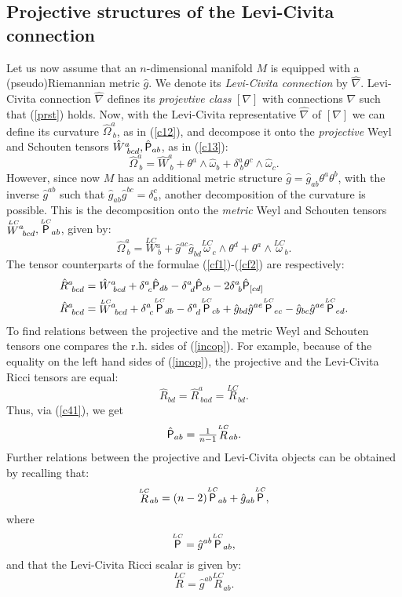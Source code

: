 \documentclass[letterpaper]{amsart}
\theoremstyle{definition}
\theoremstyle{remark}
\newcommand{\be}{\begin{equation}}
\newcommand{\ee}{\end{equation}}
\newcommand{\weyl}{{\stackrel{\scriptscriptstyle{LC}}{W}}\phantom{}}
\newcommand{\schou}{{\stackrel{\scriptscriptstyle{LC}}{\Rho}}}
\newcommand{\rlc}{{\stackrel{\scriptscriptstyle{LC}}{R}}}
\newcommand{\oms}{{\stackrel{\scriptscriptstyle{LC}}{\omega}}}
\newcommand{\dz}{\wedge}
\newcommand{\Rho}{{\mbox{\sf P}}}
\begin{document}
\subsection{Projective structures of the Levi-Civita connection}\label{sec22}
Let us now assume that an $n$-dimensional manifold $M$ is equipped
with a (pseudo)\-Riemannian metric $\hat{g}$. We denote its 
\emph{Levi-Civita connection} by $\hat{\nabla}$. Levi-Civita
connection $\hat{\nabla}$ 
defines its \emph{projevtive class} $[\nabla]$ 
with connections $\nabla$ such that (\ref{prst}) holds. Now, with the
Levi-Civita representative $\hat{\nabla}$ of $[\nabla]$ we can define
its curvature $\hat{\Omega}^a_{~b}$, as in (\ref{c12}), and decompose
it onto the \emph{projective} Weyl and Schouten tensors
$\hat{W}^a_{~bcd},\hat{\Rho}_{ab}$, as in
(\ref{c13}):
\be
\hat{\Omega}^a_{~b}=\hat{W}^a_{~b}+\theta^a\dz\hat{\omega}_b+\delta^a_{~b}\theta^c\dz\hat{\omega}_c.\label{cf1}\ee
However, since now $M$ has an additional metric structure
$\hat{g}=\hat{g}_{ab}\theta^a\theta^b$, with the inverse
$\hat{g}^{ab}$ such that $\hat{g}_{ab}\hat{g}^{bc}=\delta^c_{a}$,
another decomposition of the curvature is possible. This is the 
decomposition onto the \emph{metric} Weyl and Schouten tensors
$\weyl^a_{~bcd}, \schou_{ab}$, given by:
\be
\hat{\Omega}^a_{~b}=\weyl^a_{~b}+\hat{g}^{ac}\hat{g}_{bd}\oms_c\dz\theta^d+\theta^a\dz\oms_b.\label{cf2}\ee
The tensor counterparts of the formulae (\ref{cf1})-(\ref{cf2}) are
respectively:
\be
\begin{aligned}
&\hat{R}^a_{~bcd}=\hat{W}^a_{~bcd}+\delta^a_{~c}\hat{\Rho}_{db}-\delta^a_{~d}\hat{\Rho}_{cb}-
2\delta^a_{~b}\hat{\Rho}_{[cd]}\\
&\hat{R}^a_{~bcd}=\weyl^a_{~bcd}+\delta^a_{~c}\schou_{db}-\delta^a_{~d}\schou_{cb}
+\hat{g}_{bd}\hat{g}^{ae}\schou_{ec}-\hat{g}_{bc}\hat{g}^{ae}\schou_{ed}.
\end{aligned}
\label{incop}\ee
To find relations between the projective and the metric Weyl and
Schouten tensors one compares the r.h. sides of
(\ref{incop}). For example, because of the equality on the left hand
sides of (\ref{incop}), the projective and the Levi-Civita Ricci
tensors are equal:
$$\hat{R}_{bd}=\hat{R}^a_{~bad}=\rlc_{bd}.$$
Thus, via (\ref{c41}), we get
\be
\hat{\Rho}_{ab}=\tfrac{1}{n-1}\rlc_{ab}.\label{rholc}\ee
Further relations between the projective and Levi-Civita objects can
be obtained by recalling that:  
$$\rlc_{ab}=(n-2)\schou_{ab}+\hat{g}_{ab}\schou,$$
where
$$\schou=\hat{g}^{ab}\schou_{ab},$$
and that the Levi-Civita Ricci scalar is given by:
$$\rlc=\hat{g}^{ab}\rlc_{ab}.$$
\end{document}
